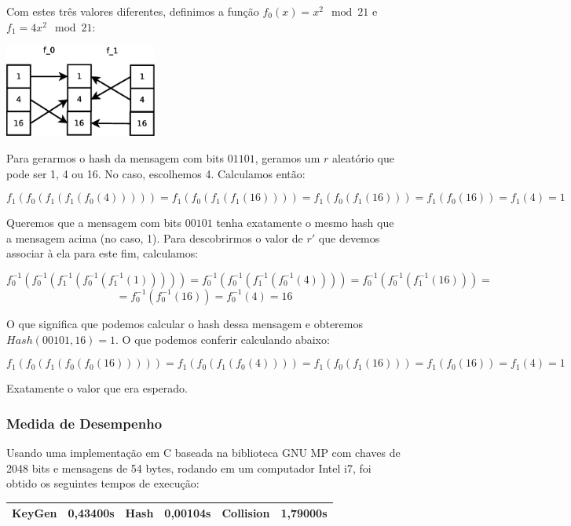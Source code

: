 \documentclass[a4paper]{article}
\begin{document}
Com estes três valores diferentes, definimos a função $f_0(x)=x^2\mod
21$ e $f_1=4x^2\mod 21$:

\includegraphics[width=5cm]{imagens/toy1.eps}

Para gerarmos o hash da mensagem com bits $01101$, geramos um $r$
aleatório que pode ser 1, 4 ou 16. No caso, escolhemos 4. Calculamos
então:

$$
f_1(f_0(f_1(f_1(f_0(4))))) = f_1(f_0(f_1(f_1(16)))) = f_1(f_0(f_1(16))) =
f_1(f_0(16)) = f_1(4) = 1
$$

Queremos que a mensagem com bits $00101$ tenha exatamente o mesmo hash
que a mensagem acima (no caso, 1). Para descobrirmos o valor de $r'$
que devemos associar à ela para este fim, calculamos:

$$
f_0^{-1}(f_0^{-1}(f_1^{-1}(f_0^{-1}(f_1^{-1}(1))))) =
f_0^{-1}(f_0^{-1}(f_1^{-1}(f_0^{-1}(4)))) =
f_0^{-1}(f_0^{-1}(f_1^{-1}(16))) =
$$
$$
=f_0^{-1}(f_0^{-1}(16)) = f_0^{-1}(4) = 16
$$

O que significa que podemos calcular o hash dessa mensagem e obteremos
$Hash(00101, 16)=1$. O que podemos conferir calculando abaixo:

$$
f_1(f_0(f_1(f_0(f_0(16))))) = f_1(f_0(f_1(f_0(4)))) = f_1(f_0(f_1(16))) =
f_1(f_0(16)) = f_1(4) = 1
$$

Exatamente o valor que era esperado.

\subsubsection{Medida de Desempenho}

Usando uma implementação em C baseada na biblioteca GNU MP com chaves
de 2048 bits e mensagens de 54 bytes, rodando em um computador Intel
i7, foi obtido os seguintes tempos de execução:

\begin{center}
\begin{tabular}{|c|c|c|c|c|c|}
  \hline
  KeyGen & 0,43400s & Hash & 0,00104s & Collision & 1,79000s\\
  \hline
\end{tabular}
\end{center}
\end{document}
